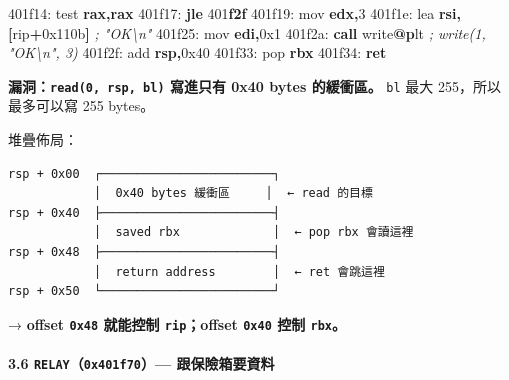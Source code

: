 \documentclass[10pt,a4paper]{article}
\newenvironment{Shaded}{\begin{snugshade}}{\end{snugshade}}
\newcommand{\BaseNTok}[1]{\textcolor[rgb]{0.00,0.00,0.81}{#1}}
\newcommand{\BuiltInTok}[1]{#1}
\newcommand{\CommentTok}[1]{\textcolor[rgb]{0.56,0.35,0.01}{\textit{#1}}}
\newcommand{\ControlFlowTok}[1]{\textcolor[rgb]{0.13,0.29,0.53}{\textbf{#1}}}
\newcommand{\DecValTok}[1]{\textcolor[rgb]{0.00,0.00,0.81}{#1}}
\newcommand{\ErrorTok}[1]{\textcolor[rgb]{0.64,0.00,0.00}{\textbf{#1}}}
\newcommand{\FunctionTok}[1]{\textcolor[rgb]{0.13,0.29,0.53}{\textbf{#1}}}
\newcommand{\KeywordTok}[1]{\textcolor[rgb]{0.13,0.29,0.53}{\textbf{#1}}}
\newcommand{\NormalTok}[1]{#1}
\newcommand{\OperatorTok}[1]{\textcolor[rgb]{0.81,0.36,0.00}{\textbf{#1}}}
\renewenvironment{Shaded}{%
  \def\FrameCommand{\fboxsep=3.2pt\colorbox{shadecolor}}%
  \MakeFramed{\advance\hsize-\width\FrameRestore\small}%
}{%
  \endMakeFramed
}
\begin{document}
\begin{Shaded}
\begin{Highlighting}[]
\NormalTok{401f14:  }\BuiltInTok{test} \KeywordTok{rax}\OperatorTok{,}\KeywordTok{rax}
\NormalTok{401f17:  }\ControlFlowTok{jle}  \DecValTok{401}\ErrorTok{f2f}
\NormalTok{401f19:  }\BuiltInTok{mov}  \KeywordTok{edx}\OperatorTok{,}\DecValTok{3}
\NormalTok{401f1e:  }\BuiltInTok{lea}  \KeywordTok{rsi}\OperatorTok{,[}\NormalTok{rip}\OperatorTok{+}\BaseNTok{0x110b}\OperatorTok{]}       \CommentTok{; "OK\textbackslash{}n"}
\NormalTok{401f25:  }\BuiltInTok{mov}  \KeywordTok{edi}\OperatorTok{,}\BaseNTok{0x1}
\NormalTok{401f2a:  }\ControlFlowTok{call}\NormalTok{ write}\FunctionTok{@}\ErrorTok{p}\NormalTok{lt              }\CommentTok{; write(1, "OK\textbackslash{}n", 3)}
\NormalTok{401f2f:  }\BuiltInTok{add}  \KeywordTok{rsp}\OperatorTok{,}\BaseNTok{0x40}
\NormalTok{401f33:  }\BuiltInTok{pop}  \KeywordTok{rbx}
\NormalTok{401f34:  }\ControlFlowTok{ret}
\end{Highlighting}
\end{Shaded}

\textbf{漏洞：\texttt{read(0,\allowbreak{}\ \allowbreak{}rsp,\allowbreak{}\ \allowbreak{}bl)} 寫進只有 0x40 bytes
的緩衝區。} \texttt{bl} 最大 255，所以最多可以寫 255 bytes。

堆疊佈局：

\begin{Verbatim}[breaklines=true,breakanywhere=true,breakautoindent=false,fontsize=\fontsize{7.0}{9.5}\selectfont]
rsp + 0x00  ┌────────────────────────┐
            │  0x40 bytes 緩衝區     │  ← read 的目標
rsp + 0x40  ├────────────────────────┤
            │  saved rbx             │  ← pop rbx 會讀這裡
rsp + 0x48  ├────────────────────────┤
            │  return address        │  ← ret 會跳這裡
rsp + 0x50  └────────────────────────┘
\end{Verbatim}

→ \textbf{offset \texttt{0x48} 就能控制 \texttt{rip}；offset
\texttt{0x40} 控制 \texttt{rbx}。}

\paragraph{\texorpdfstring{3.6 \texttt{RELAY}（\texttt{0x401f70}）---
跟保險箱要資料}{3.6 RELAY（0x401f70）--- 跟保險箱要資料}}\label{relay0x401f70-ux8ddfux4fddux96aaux7bb1ux8981ux8cc7ux6599}
\end{document}
